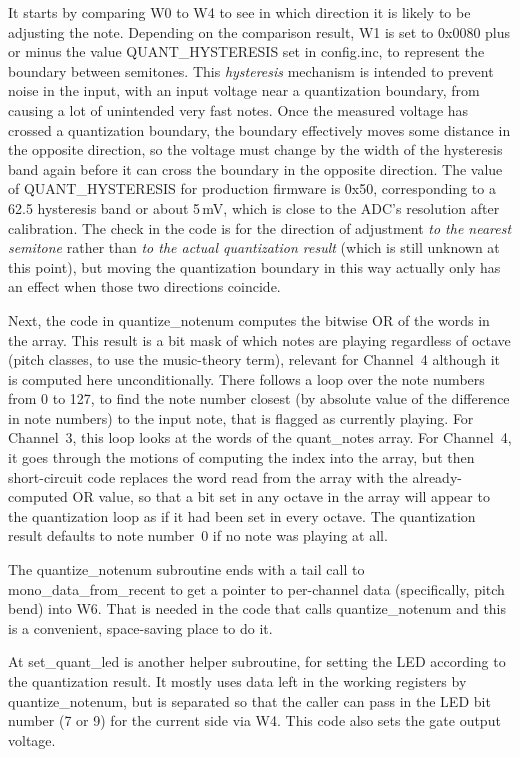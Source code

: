It starts by comparing W0 to W4 to see in which direction it is likely to be
adjusting the note.  Depending on the comparison result, W1 is set to 0x0080
plus or minus the value QUANT\_HYSTERESIS set in config.inc, to represent
the boundary between semitones.  This \emph{hysteresis} mechanism is
intended to prevent noise in the input, with an input voltage near a
quantization boundary, from causing a lot of unintended very fast notes. 
Once the measured voltage has crossed a quantization boundary, the boundary
effectively moves some distance in the opposite direction, so the voltage
must change by the width of the hysteresis band again before it can cross
the boundary in the opposite direction.  The value of QUANT\_HYSTERESIS for
production firmware is 0x50, corresponding to a 62.5\textcent{} hysteresis
band or about 5\,mV, which is close to the ADC's resolution after
calibration.  The check in the code is for the direction of adjustment
\emph{to the nearest semitone} rather than \emph{to the actual quantization
result} (which is still unknown at this point), but moving the quantization
boundary in this way actually only has an effect when those two directions
coincide.

Next, the code in quantize\_notenum computes the bitwise OR of the words in
the array.  This result is a bit mask of which notes are playing regardless
of octave (pitch classes, to use the music-theory term), relevant for
Channel~4 although it is computed here unconditionally.  There follows a
loop over the note numbers from 0 to 127, to find the note number closest
(by absolute value of the difference in note numbers) to the input note,
that is flagged as currently playing.  For Channel~3, this loop looks at the
words of the quant\_notes array.  For Channel~4, it goes through the motions
of computing the index into the array, but then short-circuit code
replaces the word read from the array with the already-computed OR value, so
that a bit set in any octave in the array will appear to the quantization
loop as if it had been set in every octave.  The quantization result
defaults to note number~0 if no note was playing at all.

The quantize\_notenum subroutine ends with a tail call to
mono\_data\_from\_recent to get a pointer to per-channel data (specifically,
pitch bend) into W6.  That is needed in the code that calls quantize\_notenum
and this is a convenient, space-saving place to do it.

At set\_quant\_led is another helper subroutine, for setting the LED
according to the quantization result.  It mostly uses data left in the
working registers by quantize\_notenum, but is separated so that the caller
can pass in the LED bit number (7 or 9) for the current side via W4.  This
code also sets the gate output voltage.

